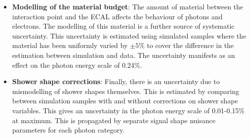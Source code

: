 \begin{itemize}[noitemsep]
{           This gives a contribution of 0.05\% uncertainty to the photon energy scale.
           }
    \item {\textbf{Modelling of the material budget}: 
           The amount of material between the interaction point and the ECAL affects the behaviour of photons and electrons. 
           The modelling of this material is a further source of systematic uncertainty. 
           This uncertainty is estimated using simulated samples where the material has been uniformly varied by $\pm5\%$ to cover the difference in the estimation between simulation and data.
           The uncertainty manifests as an effect on the photon energy scale of 0.24\%.
           }
    \item {\textbf{Shower shape corrections}: 
           Finally, there is an uncertainty due to mismodelling of shower shapes themselves. This is estimated by comparing between simulation samples with and without corrections on shower shape variables. This gives an uncertainty in the photon energy scale of 0.01-0.15\% at maximum. This is propagated by separate signal shape nuisance parameters for each photon category.  
           }
\end{itemize}

